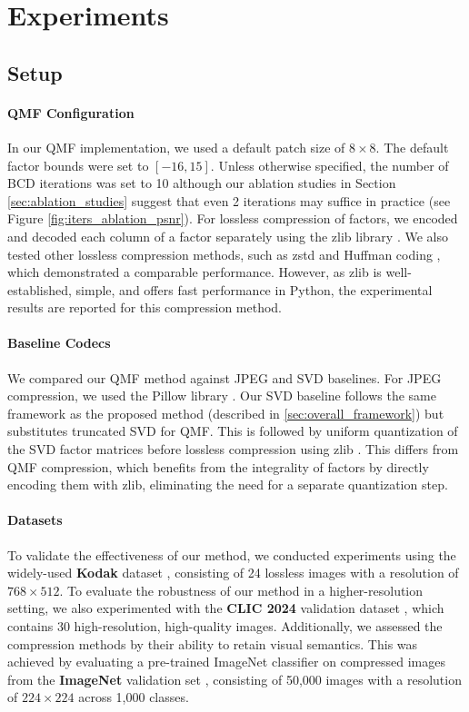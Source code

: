 \section{Experiments} \label{sec:experiments}

\subsection{Setup} \label{sec:setup}

\paragraph{QMF Configuration}
In our QMF implementation, we used a default patch size of $8 \times 8$. The default factor bounds were set to $[-16, 15]$. Unless otherwise specified, the number of BCD iterations was set to 10 although our ablation studies in Section \ref{sec:ablation_studies} suggest that even 2 iterations may suffice in practice (see Figure \ref{fig:iters_ablation_psnr}). For lossless compression of factors, we encoded and decoded each column of a factor separately using the zlib library \cite{deutsch1996zlib}. We also tested other lossless compression methods, such as zstd \cite{zstandard} and Huffman coding \cite{huffman1952method}, which demonstrated a comparable performance. However, as zlib is well-established, simple, and offers fast performance in Python, the experimental results are reported for this compression method.

\paragraph{Baseline Codecs}
We compared our QMF method against JPEG and SVD baselines. For JPEG compression, we used the Pillow library \cite{clark2015pillow}. Our SVD baseline follows the same framework as the proposed method (described in \ref{sec:overall_framework}) but substitutes truncated SVD for QMF. This is followed by uniform quantization of the SVD factor matrices before lossless compression using zlib \cite{deutsch1996zlib}. This differs from QMF compression, which benefits from the integrality of factors by directly encoding them with zlib, eliminating the need for a separate quantization step.

\paragraph{Datasets}
To validate the effectiveness of our method, we conducted experiments using the widely-used \textbf{Kodak} dataset \cite{kodak1993}, consisting of 24 lossless images with a resolution of $768 \times 512$. To evaluate the robustness of our method in a higher-resolution setting, we also experimented with the \textbf{CLIC 2024} validation dataset \cite{clic2024}, which contains 30 high-resolution, high-quality images. Additionally, we assessed the compression methods by their ability to retain visual semantics. This was achieved by evaluating a pre-trained ImageNet classifier on compressed images from the \textbf{ImageNet} validation set \cite{russakovsky2015imagenet}, consisting of 50,000 images with a resolution of $224 \times 224$ across 1,000 classes.

